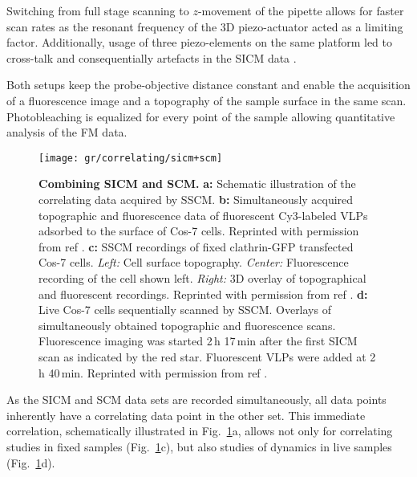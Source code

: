 Switching from full stage scanning to $z$-movement of the pipette allows for
faster scan rates as the resonant frequency of the 3D piezo-actuator acted as
a limiting factor. Additionally, usage of three piezo-elements on the same
platform led to cross-talk and consequentially artefacts in the SICM data
\cite{Shevchuk2013}. 



Both setups keep the probe-objective distance constant and enable the
acquisition of a fluorescence image and a topography of the sample surface in
the same scan. Photobleaching is equalized for every point of the sample
allowing quantitative analysis of the FM data.

\begin{figure}
  \texttt{[image: gr/correlating/sicm+scm]}
  \caption{%
    \textbf{Combining SICM and SCM.}
    \textbf{a:} Schematic illustration of the correlating data acquired by SSCM.
    \textbf{b:} Simultaneously acquired topographic and fluorescence data of fluorescent Cy3-labeled 
    VLPs adsorbed to the surface of Cos-7 cells. Reprinted with permission from ref \cite{Gorelik2002}.
    \textbf{c:} SSCM recordings of fixed clathrin-GFP transfected Cos-7 cells. 
    	\textit{Left:} Cell surface topography. 
    	\textit{Center:} Fluorescence recording of the cell shown left. 
    	\textit{Right:} 3D overlay of topographical and fluorescent recordings. 
    Reprinted with permission from ref \cite{Shevchuk2008}.
    \textbf{d:} Live Cos-7 cells sequentially scanned by SSCM. Overlays of simultaneously obtained 
    topographic and fluorescence scans. Fluorescence imaging was started 2\,h 17\,min after the first 
    SICM scan as indicated by the red star. Fluorescent VLPs were added at 2\,h 40\,min. 
    Reprinted with permission from ref \cite{Gorelik2002}.
  }
  \label{fig:sicm+scm}
\end{figure}

As the SICM and SCM data sets are recorded simultaneously, all data points inherently have a
correlating data point in the other set. This immediate correlation, schematically illustrated in
Fig.~\ref{fig:sicm+scm}a, allows not only for correlating studies in fixed
samples (Fig.~\ref{fig:sicm+scm}c), but also studies of dynamics in live
samples (Fig.~\ref{fig:sicm+scm}d).


